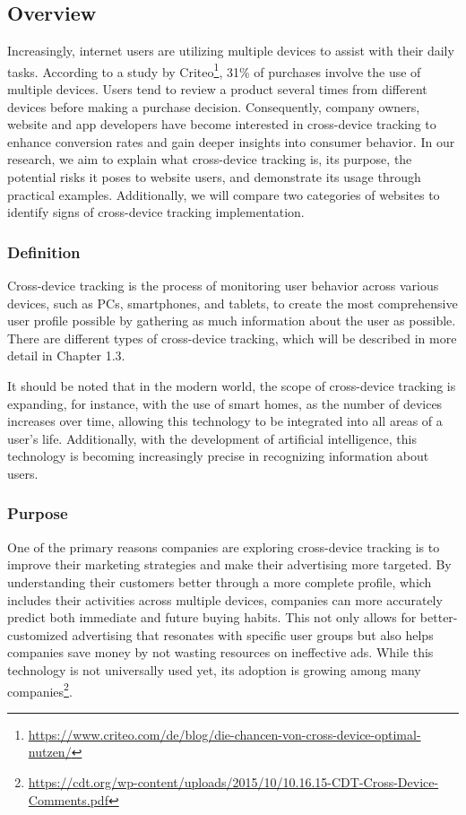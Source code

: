\subsection{Overview}
Increasingly, internet users are utilizing multiple devices to assist with their daily tasks. According to a study by Criteo\footnote{\href{https://www.criteo.com/de/blog/die-chancen-von-cross-device-optimal-nutzen/}{https://www.criteo.com/de/blog/die-chancen-von-cross-device-optimal-nutzen/}}, 31\% of purchases involve the use of multiple devices. Users tend to review a product several times from different devices before making a purchase decision. Consequently, company owners, website and app developers have become interested in cross-device tracking to enhance conversion rates and gain deeper insights into consumer behavior. In our research, we aim to explain what cross-device tracking is, its purpose, the potential risks it poses to website users, and demonstrate its usage through practical examples. Additionally, we will compare two categories of websites to identify signs of cross-device tracking implementation.

\subsubsection{Definition}
Cross-device tracking is the process of monitoring user behavior across various devices, such as PCs, smartphones, and tablets, to create the most comprehensive user profile possible by gathering as much information about the user as possible. There are different types of cross-device tracking, which will be described in more detail in Chapter 1.3.

It should be noted that in the modern world, the scope of cross-device tracking is expanding, for instance, with the use of smart homes, as the number of devices increases over time, allowing this technology to be integrated into all areas of a user's life. Additionally, with the development of artificial intelligence, this technology is becoming increasingly precise in recognizing information about users.

\subsubsection{Purpose}
One of the primary reasons companies are exploring cross-device tracking is to improve their marketing strategies and make their advertising more targeted. By understanding their customers better through a more complete profile, which includes their activities across multiple devices, companies can more accurately predict both immediate and future buying habits. This not only allows for better-customized advertising that resonates with specific user groups but also helps companies save money by not wasting resources on ineffective ads. While this technology is not universally used yet, its adoption is growing among many companies\footnote{\href{https://cdt.org/wp-content/uploads/2015/10/10.16.15-CDT-Cross-Device-Comments.pdf}{https://cdt.org/wp-content/uploads/2015/10/10.16.15-CDT-Cross-Device-Comments.pdf}}.

